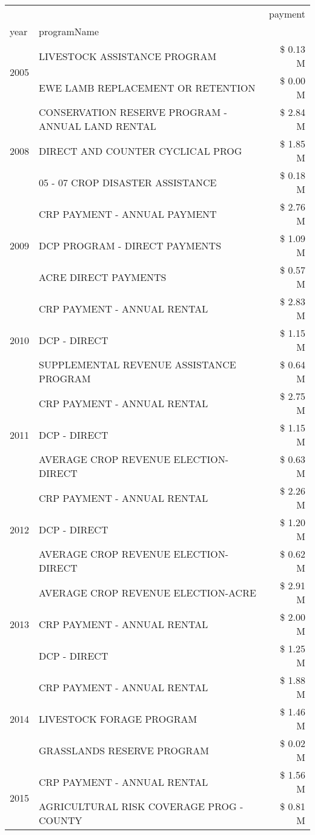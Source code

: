 \begin{tabular}{llr}
\toprule
 &  & payment \\
year & programName &  \\
\midrule
\multirow[t]{2}{*}{2005} & LIVESTOCK ASSISTANCE PROGRAM & \$ 0.13 M \\
 & EWE LAMB REPLACEMENT OR RETENTION & \$ 0.00 M \\
\cline{1-3}
\multirow[t]{3}{*}{2008} & CONSERVATION RESERVE PROGRAM - ANNUAL LAND RENTAL & \$ 2.84 M \\
 & DIRECT AND COUNTER CYCLICAL PROG & \$ 1.85 M \\
 & 05 - 07 CROP DISASTER ASSISTANCE & \$ 0.18 M \\
\cline{1-3}
\multirow[t]{3}{*}{2009} & CRP PAYMENT - ANNUAL PAYMENT & \$ 2.76 M \\
 & DCP PROGRAM - DIRECT PAYMENTS & \$ 1.09 M \\
 & ACRE DIRECT PAYMENTS & \$ 0.57 M \\
\cline{1-3}
\multirow[t]{3}{*}{2010} & CRP PAYMENT - ANNUAL RENTAL & \$ 2.83 M \\
 & DCP - DIRECT & \$ 1.15 M \\
 & SUPPLEMENTAL REVENUE ASSISTANCE PROGRAM & \$ 0.64 M \\
\cline{1-3}
\multirow[t]{3}{*}{2011} & CRP PAYMENT - ANNUAL RENTAL & \$ 2.75 M \\
 & DCP - DIRECT & \$ 1.15 M \\
 & AVERAGE CROP REVENUE ELECTION-DIRECT & \$ 0.63 M \\
\cline{1-3}
\multirow[t]{3}{*}{2012} & CRP PAYMENT - ANNUAL RENTAL & \$ 2.26 M \\
 & DCP - DIRECT & \$ 1.20 M \\
 & AVERAGE CROP REVENUE ELECTION-DIRECT & \$ 0.62 M \\
\cline{1-3}
\multirow[t]{3}{*}{2013} & AVERAGE CROP REVENUE ELECTION-ACRE & \$ 2.91 M \\
 & CRP PAYMENT - ANNUAL RENTAL & \$ 2.00 M \\
 & DCP - DIRECT & \$ 1.25 M \\
\cline{1-3}
\multirow[t]{3}{*}{2014} & CRP PAYMENT - ANNUAL RENTAL & \$ 1.88 M \\
 & LIVESTOCK FORAGE PROGRAM & \$ 1.46 M \\
 & GRASSLANDS RESERVE PROGRAM & \$ 0.02 M \\
\cline{1-3}
\multirow[t]{3}{*}{2015} & CRP PAYMENT - ANNUAL RENTAL & \$ 1.56 M \\
 & AGRICULTURAL RISK COVERAGE PROG - COUNTY & \$ 0.81 M \\

\end{tabular}
